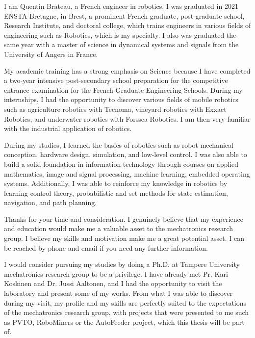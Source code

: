 \documentclass[11pt, a4paper]{awesome-cv}
\begin{document}
	\makecvheader[C]


	\makelettertitle

	\begin{cvletter}

		I am Quentin Brateau, a French engineer in robotics. I was graduated in 2021 ENSTA Bretagne, in Brest, a prominent French graduate, post-graduate school, Research Institute, and doctoral college, which trains engineers in various fields of engineering such as Robotics, which is my specialty. I also was graduated the same year with a master of science in dynamical systems and signals from the University of Angers in France.

		My academic training has a strong emphasis on Science because I have completed a two-year intensive post-secondary school preparation for the competitive entrance examination for the French Graduate Engineering Schools. During my internships, I had the opportunity to discover various fields of mobile robotics such as agriculture robotics with Tecnoma, vineyard robotics with Exxact Robotics, and underwater robotics with Forssea Robotics. I am then very familiar with the industrial application of robotics.

		During my studies, I learned the basics of robotics such as robot mechanical conception, hardware design, simulation, and low-level control. I was also able to build a solid foundation in information technology through courses on applied mathematics, image and signal processing, machine learning, embedded operating systems. Additionally, I was able to reinforce my knowledge in robotics by learning control theory, probabilistic and set methods for state estimation, navigation, and path planning.

		Thanks for your time and consideration. I genuinely believe that my experience and education would make me a valuable asset to the mechatronics research group. I believe my skills and motivation make me a great potential asset. I can be reached by phone and email if you need any further information.

		
			I would consider pursuing my studies by doing a Ph.D. at Tampere University mechatronics research group to be a privilege. I have already met Pr. Kari Koskinen and Dr. Jussi Aaltonen, and I had the opportunity to visit the laboratory and present some of my works. From what I was able to discover during my visit, my profile and my skills are perfectly suited to the expectations of the mechatronics research group, with projects that were presented to me such as PVTO, RoboMiners or the AutoFeeder project, which this thesis will be part of.


\end{cvletter}
\end{document}
